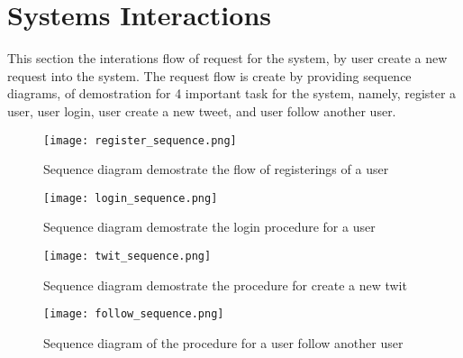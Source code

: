 \section{Systems Interactions}

This section the interations flow of request for the system, by user create a new request into the system. The request flow is create by providing sequence diagrams, of demostration for 4 important task for the system, namely, register a user, user login, user create a new tweet, and user follow another user. 



\begin{figure}[h]
	\centering
	\texttt{[image: register\_sequence.png]}
	\caption{Sequence diagram demostrate the flow of registerings of a user}
	\label{fig:register_sequence}
\end{figure}


\begin{figure}[h]
	\centering
	\texttt{[image: login\_sequence.png]}
	\caption{Sequence diagram demostrate the login procedure for a user}
	\label{fig:login_sequence}
\end{figure}

\begin{figure}[h]
	\centering
	\texttt{[image: twit\_sequence.png]}
	\caption{Sequence diagram demostrate the procedure for create a new twit}
	\label{fig:twit_sequence}
\end{figure}

\begin{figure}[h]
	\centering
	\texttt{[image: follow\_sequence.png]}
	\caption{Sequence diagram of the procedure for a user follow another user}
	\label{fig:follow_sequence}
\end{figure}

